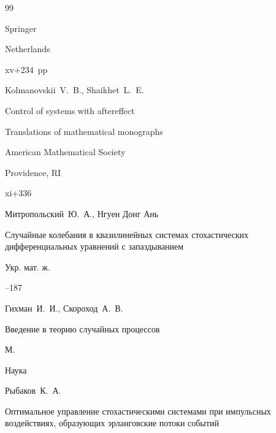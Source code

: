 \begin{thebibliography}{99}

\publ Springer 

\publaddr Netherlands


\totalpages xv+234~pp \nofrills








\by Kolmanovskii~V.~B., Shaikhet~L.~E.

\book Control of systems with aftereffect

\serial Translations of mathematical monographs


\publ American Mathematical Society

\publaddr Providence, RI


\totalpages xi+336 








\by Митропольский~Ю.~А., Нгуен Донг Ань

\paper Случайные колебания в квазилинейных системах стохастических дифференциальных уравнений с запаздыванием 

\jour Укр. мат. ж.




--187






\by Гихман~И.~И., Скороход~А.~В.

\book Введение в теорию случайных процессов

\publaddr М. 

\publ Наука






\by Рыбаков~К.~А.

\paper Оптимальное управление стохастическими системами при импульсных воздействиях, образующих эрланговские потоки событий


\end{thebibliography}
